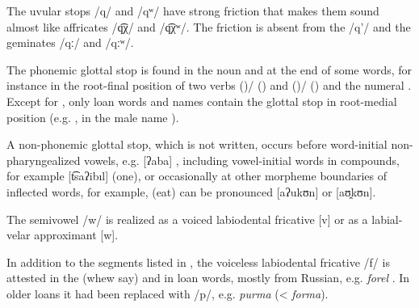 The uvular stops /q/ and /qʷ/ have strong friction that makes them sound almost like affricates /q͡χ/ and /q͡χʷ/. The friction is absent from the  /q'/ and the geminates /qː/ and /qːʷ/.

The phonemic glottal stop is found in the noun   and at the end of some words, for instance in the root-final position of two verbs  ()\slash{} ()  and  ()\slash{} ()  and the numeral  . Except for  , only loan words and names contain the glottal stop in root-medial position (e.g.  , in the male name ).

A non-phonemic glottal stop, which is not written, occurs before word-initial non-pharyngealized vowels, e.g.  [ʔaba] , including vowel-initial words in compounds, for example  [t͡saʔibıl]  (one), or occasionally at other morpheme boundaries of inflected words, for example,    (eat) can be pronounced [aʔukʊn] or [aʊ̯kʊn].

The semivowel /w/ is realized as a voiced labiodental fricative [v] or as a labial-velar approximant [w]. 

In addition to the segments listed in , the voiceless labiodental fricative /f/ is attested in the    (whew say) and in loan words, mostly from Russian, e.g. \textit{forel} . In older loans it had been replaced with /p/, e.g. \textit{purma}  (< \textit{forma}).

